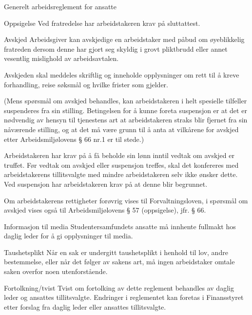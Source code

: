 \documentclass[fsbok.tex]{subfiles}
\begin{document}
\begin{lovkapittel}{Generelt arbeidsreglement for ansatte}
\begin{lovparagraf}{Oppsigelse}
        Ved fratredelse har arbeidstakeren krav på sluttattest.
    \end{lovparagraf}

    \begin{lovparagraf}{Avskjed}
        Arbeidsgiver kan avskjedige en arbeidstaker med påbud om øyeblikkelig fratreden dersom denne har gjort seg skyldig
        i grovt pliktbrudd eller annet vesentlig mislighold av arbeidsavtalen.

        Avskjeden skal meddeles skriftlig og inneholde opplysninger om rett til å kreve forhandling, reise søksmål og hvilke
        frister som gjelder.

        (Mens spørsmål om avskjed behandles, kan arbeidstakeren i helt spesielle tilfeller suspenderes fra sin stilling.
        Betingelsen for å kunne foreta suspensjon er at det er nødvendig av hensyn til tjenestens art at arbeidstakeren straks
        blir fjernet fra sin nåværende stilling, og at det må være grunn til å anta at vilkårene for avskjed etter
        Arbeidsmiljølovens § 66 nr.1 er til stede.)

        Arbeidstakeren har krav på å få beholde sin lønn inntil vedtak om avskjed er truffet.
        Før vedtak om avskjed eller suspensjon treffes, skal det konfereres med arbeidstakerens tillitsvalgte med mindre
        arbeidstakeren selv ikke ønsker dette. Ved suspensjon har arbeidstakeren krav på at denne blir begrunnet.

        Om arbeidstakerens rettigheter forøvrig vises til Forvaltningsloven, i spørsmål om avskjed vises også til
        Arbeidsmiljølovens § 57 (oppsigelse), jfr. § 66.
    \end{lovparagraf}

    \begin{lovparagraf}{Informasjon til media}
        Studentersamfundets ansatte må innhente fullmakt hos daglig leder for å gi opplysninger til media.

    \end{lovparagraf}

    \begin{lovparagraf}{Taushetsplikt}
        Når en sak er undergitt taushetsplikt i henhold til lov, andre bestemmelse, eller når det følger av sakens art, må ingen
        arbeidstaker omtale saken overfor noen utenforstående.
    \end{lovparagraf}

    \begin{lovparagraf}{Fortolkning/tvist}
        Tvist om fortolking av dette reglement behandles av daglig leder og ansattes tillitsvalgte. Endringer i reglementet kan
        foretas i Finansstyret etter forslag fra daglig leder eller ansattes tillitsvalgte.
    \end{lovparagraf}
\end{lovkapittel}
\end{document}
